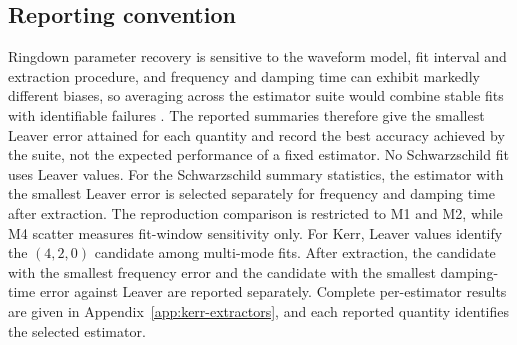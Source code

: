 \subsection{Reporting convention}
\label{sec:reporting}

Ringdown parameter recovery is sensitive to the waveform model, fit
interval and extraction procedure, and frequency and damping time can
exhibit markedly different biases, so averaging across the estimator
suite would combine stable fits with identifiable failures
\citep{Berti2007matched,Isi2021priors}. The reported summaries
therefore give the smallest Leaver error attained for each quantity
and record the best accuracy achieved by the suite, not the expected
performance of a fixed estimator.
No Schwarzschild fit uses Leaver values. For the Schwarzschild summary
statistics, the estimator with the smallest Leaver error is selected
separately for frequency and damping time after extraction. The reproduction
comparison is restricted to M1 and M2, while M4 scatter measures
fit-window sensitivity only.
For Kerr, Leaver values identify the $(4,2,0)$ candidate among
multi-mode fits. After extraction, the candidate with the smallest
frequency error and the candidate with the smallest damping-time error
against Leaver are reported separately. Complete per-estimator results
are given in Appendix~\ref{app:kerr-extractors}, and each reported
quantity identifies the selected estimator.